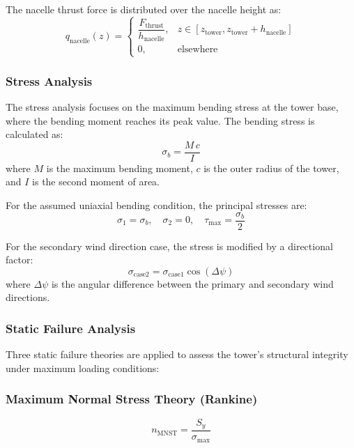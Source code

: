 \documentclass[11pt]{article}
\begin{document}
The nacelle thrust force is distributed over the nacelle height as:
\begin{equation}
 q_{\text{nacelle}}(z) = \begin{cases} \dfrac{F_{\text{thrust}}}{h_{\text{nacelle}}}, & z\in[z_{\text{tower}}, z_{\text{tower}}+h_{\text{nacelle}}] \\ 0, & \text{elsewhere} \end{cases}
\label{eq:nacelle_load}
\end{equation}

\subsubsection{Stress Analysis}

The stress analysis focuses on the maximum bending stress at the tower base, where the bending moment reaches its peak value. The bending stress is calculated as:
\begin{equation}
 \sigma_b = \frac{M\,c}{I}
\label{eq:bending_stress}
\end{equation}
where $M$ is the maximum bending moment, $c$ is the outer radius of the tower, and $I$ is the second moment of area.

For the assumed uniaxial bending condition, the principal stresses are:
\begin{equation}
 \sigma_1 = \sigma_b, \quad \sigma_2 = 0, \quad \tau_{\max} = \frac{\sigma_b}{2}
\label{eq:principal_stresses}
\end{equation}

For the secondary wind direction case, the stress is modified by a directional factor:
\begin{equation}
 \sigma_{\text{case2}} = \sigma_{\text{case1}} \cos(\Delta \psi)
\label{eq:direction_factor}
\end{equation}
where $\Delta\psi$ is the angular difference between the primary and secondary wind directions.

\subsubsection{Static Failure Analysis}

Three static failure theories are applied to assess the tower's structural integrity under maximum loading conditions:

\subsubsection*{Maximum Normal Stress Theory (Rankine)}
\begin{equation}
 n_{\text{MNST}} = \frac{S_y}{\sigma_\text{max}}
\label{eq:mnst}
\end{equation}
\end{document}
